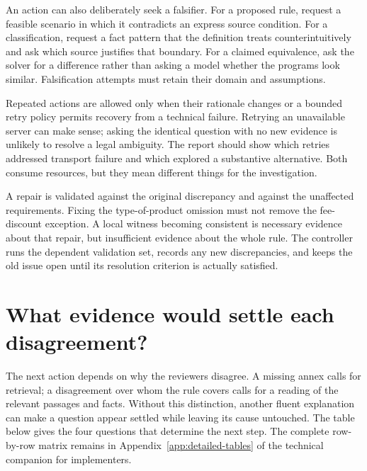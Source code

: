 \documentclass[12pt,a4paper,oneside,openany]{book}
\begin{document}
An action can also deliberately seek a falsifier. For a proposed rule, request a
feasible scenario in which it contradicts an express source condition. For a
classification, request a fact pattern that the definition treats counterintuitively
and ask which source justifies that boundary. For a claimed equivalence, ask the
solver for a difference rather than asking a model whether the programs look
similar. Falsification attempts must retain their domain and assumptions.

Repeated actions are allowed only when their rationale changes or a bounded retry
policy permits recovery from a technical failure. Retrying an unavailable server
can make sense; asking the identical question with no new evidence is unlikely
to resolve a legal ambiguity. The report should show which retries addressed
transport failure and which explored a substantive alternative. Both consume
resources, but they mean different things for the investigation.

A repair is validated against the original discrepancy and against the unaffected
requirements. Fixing the type-of-product omission must not remove the fee-discount
exception. A local witness becoming consistent is necessary evidence about that
repair, but insufficient evidence about the whole rule. The controller runs the
dependent validation set, records any new discrepancies, and keeps the old issue
open until its resolution criterion is actually satisfied.

\section{What evidence would settle each disagreement?}
\label{merge:M06:09}


The next action depends on why the reviewers disagree. A missing annex calls for
retrieval; a disagreement over whom the rule covers calls for a reading of the
relevant passages and facts. Without this distinction, another fluent
explanation can make a question appear settled while leaving its cause untouched.
The table below gives the four
questions that determine the next step. The complete row-by-row matrix remains
in Appendix~\ref{app:detailed-tables} of the technical companion for implementers.
\end{document}
